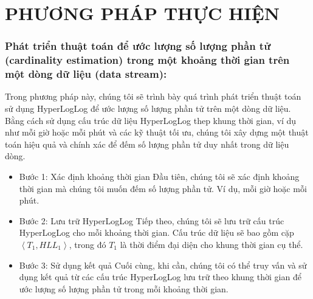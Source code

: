 \documentclass[letterpaper,13pt]{article}
\theoremstyle{mytheor}
\begin{document}
\section{PHƯƠNG PHÁP THỰC HIỆN}
\subsubsection{Phát triển thuật toán để ước lượng số lượng phần tử (cardinality estimation) trong một khoảng thời gian trên một dòng dữ liệu (data stream):}
Trong phương pháp này, chúng tôi sẽ trình bày quá trình phát triển thuật toán sử dụng HyperLogLog để ước lượng 
số lượng phần tử trên một dòng dữ liệu. Bằng cách sử dụng cấu trúc dữ liệu HyperLogLog thep khung thời gian, ví dụ như mỗi giờ hoặc mỗi phút và các kỹ thuật tối ưu, 
chúng tôi xây dựng một thuật toán hiệu quả và chính xác để đếm số lượng phần tử duy nhất trong dữ liệu dòng.
\begin{itemize}
    \item Bước 1: Xác định khoảng thời gian
    Đầu tiên, chúng tôi sẽ xác định khoảng thời gian mà chúng tôi muốn đếm số lượng phần tử. Ví dụ, mỗi giờ hoặc mỗi phút.
    \item Bước 2: Lưu trữ HyperLogLog
    Tiếp theo, chúng tôi sẽ lưu trữ cấu trúc HyperLogLog cho mỗi khoảng thời gian. Cấu trúc dữ liệu sẽ bao gồm cặp $\left< T_1, HLL_1\right>$, 
    trong đó $T_1$ là thời điểm đại diện cho khung thời gian cụ thể.
    \item Bước 3: Sử dụng kết quả
    Cuối cùng, khi cần, chúng tôi có thể truy vấn và sử dụng kết quả từ các cấu trúc HyperLogLog lưu trữ theo khung thời gian để 
    ước lượng số lượng phần tử trong mỗi khoảng thời gian.
\end{itemize}
\end{document}
